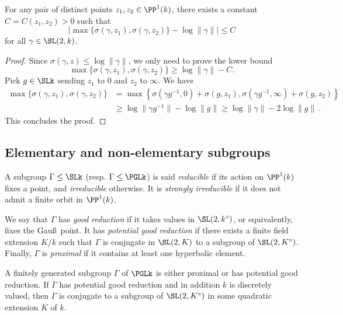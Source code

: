 \begin{lemm}\label{lem:two points}
For any pair of distinct points $z_1, z_2 \in \PP^1(k)$, there exists a constant $C = C(z_1, z_2)>0$ such that
\[
\left| \max \{ \sigma(\gamma, z_1), \sigma(\gamma, z_2)\} - \log \| \gamma \| \right|
\le C
\]
for all $\gamma\in \SL(2,k)$.
\end{lemm}
\begin{proof}
Since $ \sigma(\gamma, z) \le \log \| \gamma\|$, we only need to prove the lower bound
\[
\max \{ \sigma(\gamma, z_1), \sigma(\gamma, z_2)\} \ge \log \| \gamma \| -C.
\]
Pick $g\in \SLk$ sending $z_1$ to $0$ and $z_2$ to $\infty$. We have
\begin{align*}
\max \{ \sigma(\gamma, z_1), \sigma(\gamma, z_2)\} &=
\max \left\{ \sigma(\gamma g^{-1}, 0) + \sigma (g,z_1), \sigma(\gamma g^{-1}, \infty) + \sigma (g,z_2)\right\}\\
&\ge \log \| \gamma g^{-1}\| -\log \| g \| \ge \log \| \gamma\| - 2\log \| g \|~.
\end{align*}
This concludes the proof.
\end{proof}



\subsection{Elementary and non-elementary subgroups} \label{subs:elementary}

A subgroup $\Gamma\leq \SLk$ (resp. $\Gamma \leq \PGLk$) is said \emph{reducible} if its action on $\PP^1(k)$ fixes a point, and \emph{irreducible} otherwise. It is \emph{strongly irreducible} if it does not admit a finite orbit in $\PP^1(k)$.

We say that $\Gamma$ has \emph{good reduction} if it takes values in $\SL(2,k^\circ)$, or equivalently, fixes the Gau\ss~point. It has \emph{potential good reduction} if there exists a finite field extension $K/k$ such that $\Gamma$ is conjugate in $\SL(2,K)$ to a subgroup of $\SL(2,K^\circ)$. Finally, $\Gamma$ is \emph{proximal } if it contains at least one hyperbolic element.

\begin{prop}\label{prop:fixed point}
A finitely generated subgroup $\Gamma$ of $\PGLk$ is either proximal or has potential good reduction. If $\Gamma$ has potential good reduction and in addition $k$ is discretely valued, then $\Gamma$ is conjugate to a subgroup of $\SL(2,K^\circ)$ in some quadratic extension $K$ of $k$.
\end{prop}

